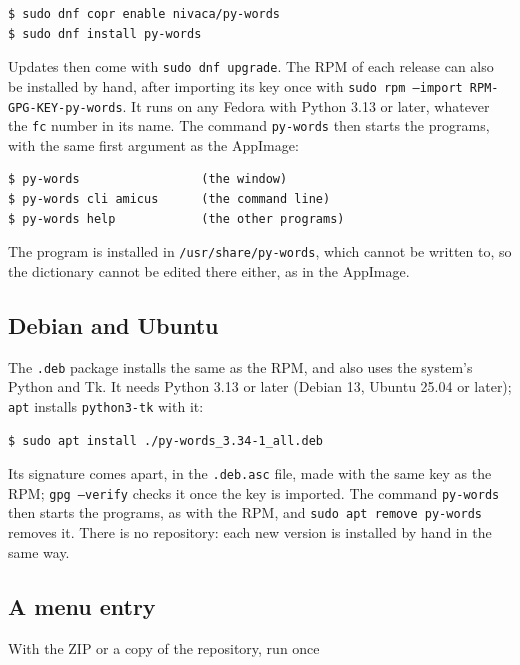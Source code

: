 \documentclass[12pt,
              article,
              oneside
              ]{memoir}
\begin{document}
\begin{verbatim}
$ sudo dnf copr enable nivaca/py-words
$ sudo dnf install py-words
\end{verbatim}

\noindent
Updates then come with \texttt{sudo dnf upgrade}. The RPM of each release
can also be installed by hand, after importing its key once with
\texttt{sudo rpm --import RPM-GPG-KEY-py-words}. It runs on any Fedora
with Python 3.13 or later, whatever the \texttt{fc} number in its name.
The command \texttt{py-words} then starts the programs, with the same
first argument as the AppImage:

\begin{verbatim}
$ py-words                 (the window)
$ py-words cli amicus      (the command line)
$ py-words help            (the other programs)
\end{verbatim}

\noindent{}%
The program is installed in \texttt{/usr/share/py-words}, which cannot be
written to, so the dictionary cannot be edited there either, as in the
AppImage.

\subsection{Debian and Ubuntu}

%
The \texttt{.deb} package installs the same as the RPM, and also uses the
system's Python and Tk. It needs Python 3.13 or later (Debian 13, Ubuntu
25.04 or later); \texttt{apt} installs \texttt{python3-tk} with it:

\begin{verbatim}
$ sudo apt install ./py-words_3.34-1_all.deb
\end{verbatim}

\noindent
Its signature comes apart, in the \texttt{.deb.asc} file, made with the
same key as the RPM; \texttt{gpg --verify} checks it once the key is
imported. The command \texttt{py-words} then starts the programs, as with
the RPM, and \texttt{sudo apt remove py-words} removes it. There is no
repository: each new version is installed by hand in the same way.

\subsection{A menu entry}

%
With the ZIP or a copy of the repository, run once
\end{document}
